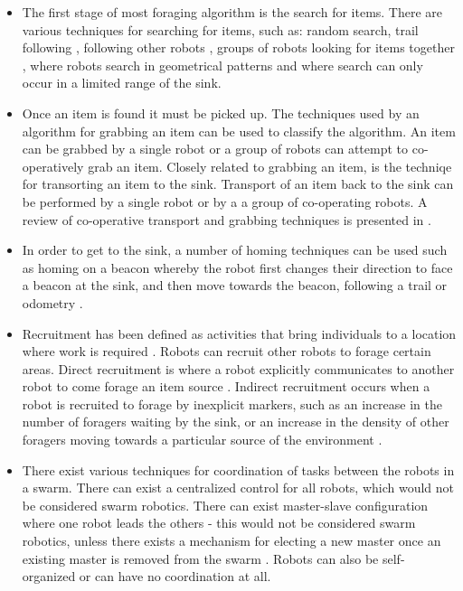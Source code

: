 \begin{itemize}
\item The first stage of most foraging algorithm is the search for items. There are various techniques for searching for items, such as: random search, trail following \cite{schmickl2006trophallaxis}, following other robots \cite{dorigo2013swarmanoid, werger1996robotic}, groups of robots looking for items together \cite{vincent2004framework}, where robots search in geometrical patterns and where search can only occur in a limited range of the sink.

\item Once an item is found it must be picked up. The techniques used by an algorithm for grabbing an item can be used to classify the algorithm. An item can be grabbed by a single robot or a group of robots can attempt to co-operatively grab an item. Closely related to grabbing an item, is the techniqe for transorting an item to the sink. Transport of an item back to the sink can be performed by a single robot or by a a group of co-operating robots. A review of co-operative transport and grabbing techniques is presented in \cite{kube2000cooperative}.

\item In order to get to the sink, a number of homing techniques can be used such as homing on a beacon whereby the robot first changes their direction to face a beacon at the sink, and then move towards the beacon, following a trail or odometry \cite{winfield2009towards}.

\item Recruitment has been defined as activities that bring individuals to a location where work is required \cite{holldobler1990ants}. Robots can recruit other robots to forage certain areas. Direct recruitment is where a robot explicitly communicates to another robot to come forage an item source \cite{krieger2000ant,labella2006division}. Indirect recruitment occurs when a robot is recruited to forage by inexplicit markers, such as an increase in the number of foragers waiting by the sink, or an increase in the density of other foragers moving towards a particular source of the environment \cite{arkin1992cooperation}. 

\item There exist various techniques for coordination of tasks between the robots in a swarm. There can exist a centralized control for all robots, which would not be considered swarm robotics. There can exist master-slave configuration where one robot leads the others - this would not be considered swarm robotics, unless there exists a mechanism for electing a new master once an existing master is removed from the swarm \cite{karpov2015leader, hoeing2007auction}. Robots can also be self-organized or can have no coordination at all. 
\end{itemize}

